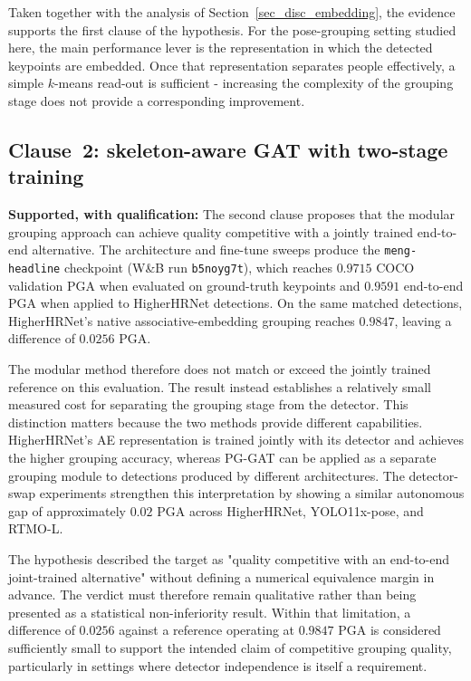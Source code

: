 Taken together with the analysis of Section~\ref{sec_disc_embedding},
the evidence supports the first clause of the hypothesis.
For the pose-grouping setting studied here,
the main performance lever is the representation in which the detected
keypoints are embedded.
Once that representation separates people effectively,
a simple $k$-means read-out is sufficient -
increasing the complexity of the grouping stage does not provide a
corresponding improvement.

\subsection{Clause~2: skeleton-aware GAT with two-stage training}
\label{sec_conc_verdict_architecture}

\textbf{Supported, with qualification:}
The second clause proposes that the modular grouping approach can achieve
quality competitive with a jointly trained end-to-end alternative.
The architecture and fine-tune sweeps produce the
\texttt{meng-headline} checkpoint (W\&B run \texttt{b5noyg7t}),
which reaches $0.9715$ COCO validation PGA when evaluated on
ground-truth keypoints and $0.9591$ end-to-end PGA when applied to
HigherHRNet detections.
On the same matched detections,
HigherHRNet's native associative-embedding grouping reaches $0.9847$,
leaving a difference of $0.0256$ PGA.

The modular method therefore does not match or exceed the jointly
trained reference on this evaluation.
The result instead establishes a relatively small measured cost for
separating the grouping stage from the detector.
This distinction matters because the two methods provide different
capabilities.
HigherHRNet's AE representation is trained jointly with its detector and
achieves the higher grouping accuracy,
whereas PG-GAT can be applied as a separate grouping module to
detections produced by different architectures.
The detector-swap experiments strengthen this interpretation by showing
a similar autonomous gap of approximately $0.02$ PGA across
HigherHRNet,
YOLO11x-pose,
and RTMO-L.

The hypothesis described the target as "quality competitive with an
end-to-end joint-trained alternative" without defining a numerical
equivalence margin in advance.
The verdict must therefore remain qualitative rather than being
presented as a statistical non-inferiority result.
Within that limitation, a difference of $0.0256$ against a reference
operating at $0.9847$ PGA is considered sufficiently small to support
the intended claim of competitive grouping quality,
particularly in settings where detector independence is itself a
requirement.

